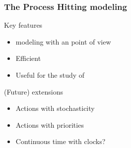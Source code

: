 \begin{frame}[c]
  \frametitle{The Process Hitting modeling}

\begin{block}{Key features} 
\begin{itemize}
  \item {} modeling with an  point of view

  \item Efficient 

  \item Useful for the study of 

  \end{itemize}
\end{block}

\begin{alertblock}{(Future) extensions} 
  \begin{itemize}
    \item Actions with stochasticity
    \item Actions with priorities
    \item Continuous time with clocks?
  \end{itemize}
\end{alertblock}

\end{frame}
